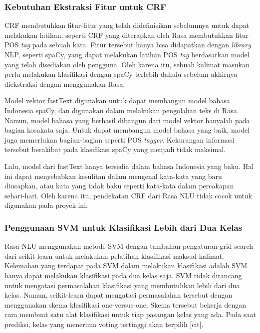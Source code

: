 \subsubsection{Kebutuhan Ekstraksi Fitur untuk CRF}

CRF membutuhkan fitur-fitur yang telah didefinisikan sebelumnya untuk dapat melakukan latihan, seperti CRF yang diterapkan oleh Rasa membutuhkan fitur POS \textit{tag} pada sebuah kata. Fitur tersebut hanya bisa didapatkan dengan \textit{library} NLP, seperti spaCy, yang dapat melakukan latihan POS \textit{tag} berdasarkan model yang telah disediakan oleh pengguna. Oleh karena itu, sebuah kalimat masukan perlu melakukan klasifikasi dengan spaCy terlebih dahulu sebelum akhirnya diekstraksi dengan menggunakan Rasa.

Model vektor fastText digunakan untuk dapat membangun model bahasa Indonesia spaCy, dan digunakan dalam melakukan pengolahan teks di Rasa. Namun, model bahasa yang berhasil dibangun dari model vektor hanyalah pada bagian kosakata saja. Untuk dapat membangun model bahasa yang baik, model juga memerlukan bagian-bagian seperti POS \textit{tagger}. Kekurangan informasi tersebut berakibat pada klasifikasi spaCy yang menjadi tidak maksimal.

Lalu, model dari fastText hanya tersedia dalam bahasa Indonesia yang baku. Hal ini dapat menyebabkan kesulitan dalam mengenal kata-kata yang baru diucapkan, atau kata yang tidak baku seperti kata-kata dalam percakapan sehari-hari. Oleh karena itu, pendekatan CRF dari Rasa NLU tidak cocok untuk digunakan pada proyek ini.

\subsubsection{Penggunaan SVM untuk Klasifikasi Lebih dari Dua Kelas}

Rasa NLU menggunakan metode SVM dengan tambahan pengaturan grid-search dari scikit-learn untuk melakukan pelatihan klasifikasi maksud kalimat. Kelemahan yang terdapat pada SVM dalam melakukan klasifikasi adalah SVM hanya dapat melakukan klasifikasi pada dua kelas saja. SVM tidak dirancang untuk mengatasi permasalahan klasifikasi yang membutuhkan lebih dari dua kelas. Namun, scikit-learn dapat mengatasi permasalahan tersebut dengan menggunakan skema klasifikasi one-versus-one. Skema tersebut bekerja dengan cara membuat satu alat klasifikasi untuk tiap pasangan kelas yang ada. Pada saat prediksi, kelas yang menerima voting tertinggi akan terpilih [cit].

